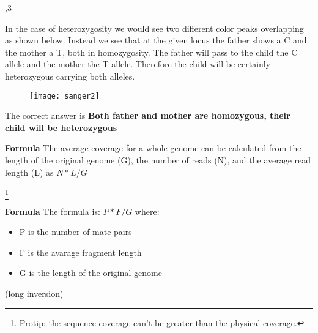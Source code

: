 \begin{Answer} [
   ref={ex16},
   number={16}
 ]

  ,3

In the case of heterozygosity we would see two different color peaks
overlapping as shown below.
Instead we see that at the given locus the father shows a C and the mother
a T, both in homozygosity.
The father will pass to the child the C allele and the mother the T allele.
Therefore the child will be certainly heterozygous carrying both alleles.

 \begin{figure}[H]
  \centering
  \texttt{[image: sanger2]}
 \end{figure}

The correct answer is \textbf{Both father and mother are homozygous,
their child will be heterozygous}

\end{Answer}

\begin{Answer} [
   ref={ex17},
   number={17}
 ]


\textbf{Formula} The average coverage for a whole genome can be calculated
from the length of the original genome (G), the number of reads (N), and the
average read length (L) as $N*L/G$

\end{Answer}

\begin{Answer} [
   ref={ex18},
   number={18}
 ]

  \footnote{Protip: the sequence coverage can't be greater than the
physical coverage.}

\textbf{Formula} The formula is: $P*F/G$ where:
\begin{itemize}
 \item P is the number of mate pairs
 \item F is the avarage fragment length
 \item G is the length of the original genome
\end{itemize}

\end{Answer}

\begin{Answer} [
   ref={ex19},
   number={19}
 ]

   (long inversion)

\end{Answer}

